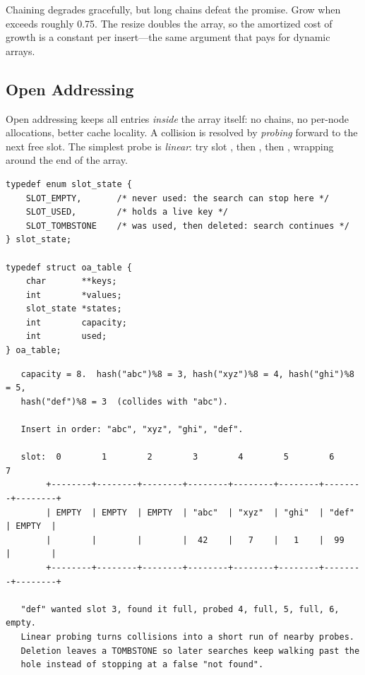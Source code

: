 \begin{ruleofthumb}
Chaining degrades gracefully, but long chains defeat the 
promise. Grow when  exceeds roughly 0.75. The
resize doubles the array, so the amortized cost of growth is a
constant per insert---the same argument that pays for dynamic arrays.
\end{ruleofthumb}

\subsection{Open Addressing}

Open addressing keeps all entries \emph{inside} the array itself:
no chains, no per-node allocations, better cache locality. A collision
is resolved by \emph{probing} forward to the next free slot. The
simplest probe is \emph{linear}: try slot , then ,
then , wrapping around the end of the array.

\begin{lstlisting}[caption={An open-addressing table with linear probing.}]
typedef enum slot_state {
    SLOT_EMPTY,       /* never used: the search can stop here */
    SLOT_USED,        /* holds a live key */
    SLOT_TOMBSTONE    /* was used, then deleted: search continues */
} slot_state;

typedef struct oa_table {
    char       **keys;
    int        *values;
    slot_state *states;
    int        capacity;
    int        used;
} oa_table;
\end{lstlisting}

\begin{verbatim}
   capacity = 8.  hash("abc")%8 = 3, hash("xyz")%8 = 4, hash("ghi")%8 = 5,
   hash("def")%8 = 3  (collides with "abc").

   Insert in order: "abc", "xyz", "ghi", "def".

   slot:  0        1        2        3        4        5        6        7
        +--------+--------+--------+--------+--------+--------+--------+--------+
        | EMPTY  | EMPTY  | EMPTY  | "abc"  | "xyz"  | "ghi"  | "def"  | EMPTY  |
        |        |        |        |  42    |   7    |   1    |  99    |        |
        +--------+--------+--------+--------+--------+--------+--------+--------+

   "def" wanted slot 3, found it full, probed 4, full, 5, full, 6, empty.
   Linear probing turns collisions into a short run of nearby probes.
   Deletion leaves a TOMBSTONE so later searches keep walking past the
   hole instead of stopping at a false "not found".
\end{verbatim}

